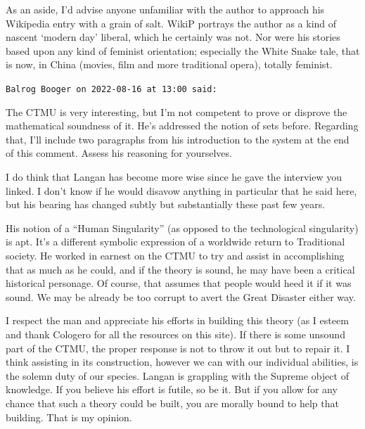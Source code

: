 \begin{footnotesize}
\begin{sffamily}
As an aside, I'd advise anyone unfamiliar with the author to approach his Wikipedia entry with a grain of salt. WikiP portrays the author as a kind of nascent `modern day' liberal, which he certainly was not. Nor were his stories based upon any kind of feminist orientation; especially the White Snake tale, that is now, in China (movies, film and more traditional opera), totally feminist.

\hfill

\texttt{Balrog Booger on 2022-08-16 at 13:00 said:}

The CTMU is very interesting, but I'm not competent to prove or disprove the mathematical soundness of it. He's addressed the notion of sets before. Regarding that, I'll include two paragraphs from his introduction to the system at the end of this comment. Assess his reasoning for yourselves.

I do think that Langan has become more wise since he gave the interview you linked. I don't know if he would disavow anything in particular that he said here, but his bearing has changed subtly but substantially these past few years.

His notion of a ``Human Singularity'' (as opposed to the technological singularity) is apt. It's a different symbolic expression of a worldwide return to Traditional society. He worked in earnest on the CTMU to try and assist in accomplishing that as much as he could, and if the theory is sound, he may have been a critical historical personage. Of course, that assumes that people would heed it if it was sound. We may be already be too corrupt to avert the Great Disaster either way.

I respect the man and appreciate his efforts in building this theory (as I esteem and thank Cologero for all the resources on this site). If there is some unsound part of the CTMU, the proper response is not to throw it out but to repair it. I think assisting in its construction, however we can with our individual abilities, is the solemn duty of our species. Langan is grappling with the Supreme object of knowledge. If you believe his effort is futile, so be it. But if you allow for any chance that such a theory could be built, you are morally bound to help that building. That is my opinion.


\end{sffamily}
\end{footnotesize}
